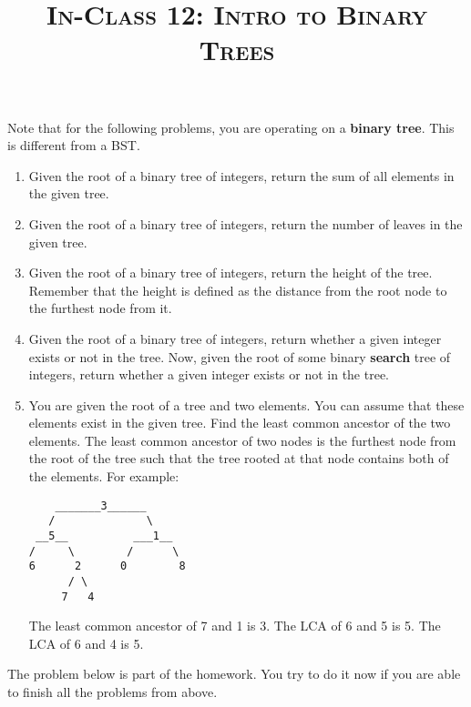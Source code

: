 \documentclass{article}
\title{\large{\textsc{In-Class 12: Intro to Binary Trees}}}
\date{}
\begin{document}
\maketitle

\subsection*{}

Note that for the following problems, you are operating on a \textbf{binary tree}. This is different from a BST.

\begin{enumerate}

\item Given the root of a binary tree of integers, return the sum of all elements in the given tree.

\item Given the root of a binary tree of integers, return the number of leaves in the given tree.

\item Given the root of a binary tree of integers, return the height of the tree. Remember that the height is defined as the distance from the root node to the furthest node from it.

\item Given the root of a binary tree of integers, return whether a given integer exists or not in the tree. Now, given the root of some binary \textbf{search} tree of integers, return whether a given integer exists or not in the tree.

\item You are given the root of a tree and two elements. You can assume that these elements exist in the given tree. Find the least common ancestor of the two elements. The least common ancestor of two nodes is the furthest node from the root of the tree such that the tree rooted at that node contains both of the elements. For example:

\begin{lstlisting}
    _______3______
   /              \
 __5__          ___1__
/     \        /      \
6      2      0        8
      / \
     7   4
\end{lstlisting}

The least common ancestor of 7 and 1 is 3. The LCA of 6 and 5 is 5. The LCA of 6 and 4 is 5.

\end{enumerate}

\noindent The problem below is part of the homework. You try to do it now if you are able to finish all the problems from above.
\end{document}
